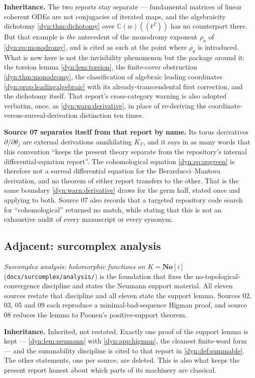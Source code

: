 \documentclass[11pt,letterpaper]{article}
\theoremstyle{definition}
\theoremstyle{remark}
\newcommand{\C}{\mathbb C}
\newcommand{\No}{\mathbf{No}}
\numberwithin{equation}{section}
\begin{document}
\textbf{Inheritance.} The two reports stay separate --- fundamental
matrices of linear coherent ODEs are not conjugacies of iterated maps, and
the algebraicity dichotomy \cref{dyn:thm:dichotomy} over
$\C(w)((t^{\Gamma}))$ has no counterpart there. But that example is
\emph{the} antecedent of the monodromy exponent $\rho_a$ of
\eqref{dyn:eq:monodromy}, and is cited as such at the point where $\rho_a$
is introduced. What is new here is not the invisibility phenomenon but the
package around it: the torsion lemma
\cref{dyn:lem:torsion}, the finite-cover obstruction
\cref{dyn:thm:monodromy}, the classification of algebraic leading
coordinates \cref{dyn:prop:leadingalgebraic} with its
already-transcendental first correction, and the dichotomy itself. That
report's cross-category warning is also adopted verbatim, once, as
\cref{dyn:warn:derivative}, in place of re-deriving the
coordinate-versus-surreal-derivation distinction ten times.

\textbf{Source 07 separates itself from that report by name.} Its torus
derivatives $\partial/\partial\theta_j$ are external derivations
annihilating $K_\Gamma$, and it says in as many words that this convention
``keeps the present theory separate from the repository's internal
differential-equation report''. The cohomological equation
\eqref{dyn:eq:qpgreen} is therefore not a surreal differential equation for
the Berarducci--Mantova derivation, and no theorem of either report
transfers to the other. That is the same boundary
\cref{dyn:warn:derivative} draws for the germ half, stated once and
applying to both. Source 07 also records that a targeted repository code
search for ``cohomological'' returned no match, while stating that this is
not an exhaustive audit of every manuscript or every synonym.

\subsection{Adjacent: surcomplex analysis}
\emph{Surcomplex analysis: holomorphic functions on $K=\No[i]$}
(\texttt{docs/surcomplex/analysis/}) is the foundation that fixes the
no-topological-convergence discipline and states the Neumann support
material. All eleven sources restate that discipline and all eleven
state the support lemma. Sources 02, 03, 05 and 09 each reproduce a
minimal-bad-sequence Higman proof, and source 08 reduces the lemma to
Poonen's positive-support theorem.

\textbf{Inheritance.} Inherited, not restated. Exactly one proof of the
support lemma is kept --- \cref{dyn:lem:neumann} with
\cref{dyn:app:higman}, the cleanest finite-word form --- and the
summability discipline is cited to that report in
\cref{dyn:def:summable}. The other statements, one per source, are
deleted. This is
also what keeps the present report honest about which parts of its
machinery are classical.
\end{document}
